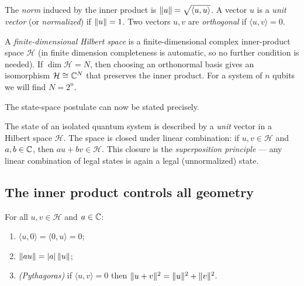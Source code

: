 \begin{definition}\label{l1:def:norm}
The \emph{norm} induced by the inner product is
$\lVert u\rVert=\sqrt{\langle u,u\rangle}$. A vector $u$ is a \emph{unit vector}
(or \emph{normalized}) if $\lVert u\rVert=1$. Two vectors $u,v$ are \emph{orthogonal}
if $\langle u,v\rangle=0$.
\end{definition}

\begin{definition}\label{l1:def:hilbert}
A \emph{finite-dimensional Hilbert space} is a finite-dimensional complex
inner-product space $\mathcal{H}$ (in finite dimension completeness is automatic,
so no further condition is needed). If $\dim\mathcal{H}=N$, then choosing an
orthonormal basis gives an isomorphism $\mathcal{H}\cong\mathbb{C}^{N}$ that preserves the
inner product. For a system of $n$ qubits we will find $N=2^{n}$.
\end{definition}

The state-space postulate can now be stated precisely.

\begin{remark}
The state of an isolated quantum system is described by a \emph{unit} vector in a
Hilbert space $\mathcal{H}$. The space is closed under linear combination: if
$u,v\in\mathcal{H}$ and $a,b\in\mathbb{C}$, then $a u+b v\in\mathcal{H}$. This closure is
the \emph{superposition principle} --- any linear combination of legal states is
again a legal (unnormalized) state.
\end{remark}

\subsection{The inner product controls all geometry}

\begin{proposition}\label{l1:prop:elem}
For all $u,v\in\mathcal{H}$ and $a\in\mathbb{C}$:
\begin{enumerate}[label=(\alph*)]
  \item $\langle u,0\rangle=\langle 0,u\rangle=0$;
  \item $\lVert a u\rVert=\lvert a\rvert\,\lVert u\rVert$;
  \item \emph{(Pythagoras)} if $\langle u,v\rangle=0$ then
        $\lVert u+v\rVert^{2}=\lVert u\rVert^{2}+\lVert v\rVert^{2}$.
\end{enumerate}
\end{proposition}

